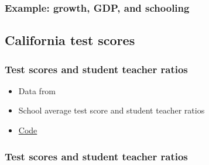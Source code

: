 \begin{frame}\frametitle{Example: growth, GDP, and schooling}
  
\end{frame}

\subsection{California test scores}
\begin{frame} \frametitle{Test scores and student teacher ratios}
  \begin{itemize}
  \item Data from \cite{sw2009}
  \item School average test score and student teacher ratios
  \item
    \href{https://bitbucket.org/paulschrimpf/econ326/src/master/notes/04/caSchool.R?at=master}
    {Code}   
  \end{itemize}    
\end{frame}

\begin{frame} \frametitle{Test scores and student teacher ratios}
  
\end{frame}

